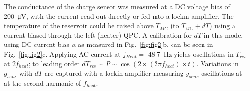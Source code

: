\documentclass[twocolumn,showpacs,preprintnumbers,amsmath,amssymb,pra,aps,superscriptaddress]{revtex4-1}
\begin{document}
The conductance of the charge sensor was measured at a DC voltage bias of \SI{200}{\micro\volt}, with the current read out directly or fed into a lockin amplifier.  The temperature of the reservoir could be raised above $T_{MC}$ (to $T_{MC} + dT$) using a current biased through the left (heater) QPC. A calibration for $dT$ in this mode, using DC current bias $\alpha$ as measured in Fig.~\ref{fig:fig2}b, can be seen in Fig.~\ref{fig:fig2}c. Applying AC current at $f_{Heat} =$ \SI{48.7}{\hertz} yields oscillations in $T_{res}$ at $2f_{heat}$; to leading order $dT_{res} \sim P \sim \cos(2 \times (2 \pi f_{heat}) \times t)$. Variations in $g_{sens}$ with $dT$ are captured with a lockin amplifier measuring $g_{sens}$ oscillations at at the second harmonic of $f_{heat}$. 


{}

\end{document}
